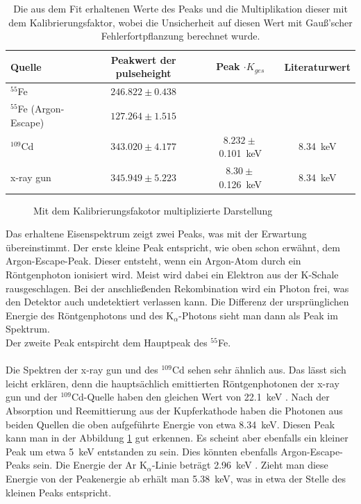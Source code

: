 \begin{table}
    \begin{tabular}{|l||c|c|c|}
        \hline 
        Quelle & Peakwert der pulseheight & Peak $\cdot K_{ges}$ & Literaturwert \\ 
        \hline 
        \hline 
        $^{55}$Fe & $246.822 \pm 0.438$ & & \\
        \hline 
        $ ^{55}$Fe (Argon-Escape) & $ 127.264 \pm 1.515$ & &  \\ 
        \hline 
        $^{109}$Cd & $343.020 \pm 4.177$ & $ 8.232 \pm $ \SI{0.101}{\keV} & \SI{8.34}{\keV} \cite{Anleitungsmappe}\\
        \hline 
        x-ray gun & $345.949 \pm 5.223$ & $8.30 \pm $ \SI{0.126}{\keV} & \SI{8.34}{\keV} \cite{Anleitungsmappe}\\
        \hline 
    \end{tabular}
    \label{tab:Spektralanalyse}
    \caption{Die aus dem Fit erhaltenen Werte des Peaks und die Multiplikation dieser mit dem Kalibrierungsfaktor, wobei die Unsicherheit auf diesen Wert mit Gauß'scher Fehlerfortpflanzung berechnet wurde.}
\end{table}

\begin{figure}[h]
    \centering
    
    \caption{Mit dem Kalibrierungsfakotor multiplizierte Darstellung}
    \label{fig:Spektren_Energie}
    
\end{figure}
    
Das erhaltene Eisenspektrum zeigt zwei Peaks, was mit der Erwartung übereinstimmt. Der erste kleine Peak entspricht, wie oben schon erwähnt, dem Argon-Escape-Peak. Dieser entsteht, wenn ein Argon-Atom durch ein Röntgenphoton ionisiert wird. Meist wird dabei ein Elektron aus der K-Schale rausgeschlagen. Bei der anschließenden Rekombination wird ein Photon frei, was den Detektor auch undetektiert verlassen kann. Die Differenz der ursprünglichen Energie des Röntgenphotons und des K$_{\alpha}$-Photons sieht man dann als Peak im Spektrum. \\
Der zweite Peak entspircht dem Hauptpeak des $^{55}$Fe. \\ 
\\
Die Spektren der x-ray gun und des $^{109}$Cd sehen sehr ähnlich aus. Das lässt sich leicht erklären, denn die hauptsächlich emittierten Röntgenphotonen der x-ray gun und der $^{109}$Cd-Quelle haben den gleichen Wert von \SI{22.1}{\keV} \cite{Anleitungsmappe}. Nach der Absorption und Reemittierung aus der Kupferkathode haben die Photonen aus beiden Quellen die oben aufgeführte Energie von etwa \SI{8.34}{\keV}. Diesen Peak kann man in der Abbildung \ref{fig:Spektren_Energie} gut erkennen. Es scheint aber ebenfalls ein kleiner Peak um etwa \SI{5}{\keV} entstanden zu sein. Dies könnten ebenfalls Argon-Escape-Peaks sein. Die Energie der Ar K$_{\alpha}$-Linie beträgt \SI{2.96}{\keV} \cite{K_alpha-Linien}. Zieht man diese Energie von der Peakenergie ab erhält man \SI{5.38}{\keV}, was in etwa der Stelle des kleinen Peaks entspricht. \\


